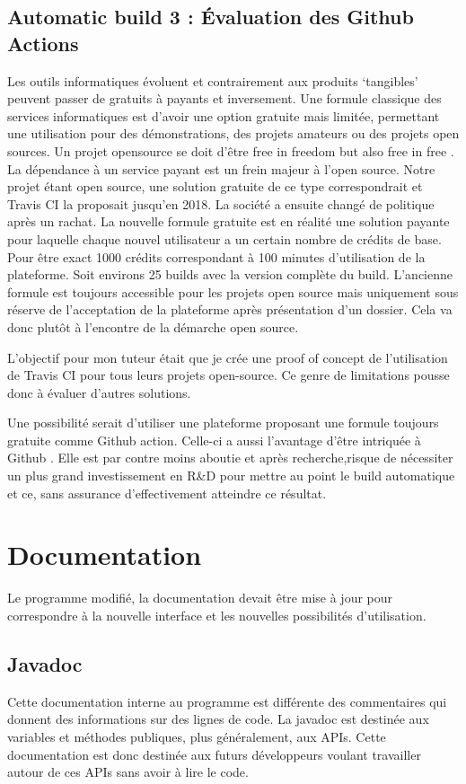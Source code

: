 \documentclass[french,a4paper,12pt]{report}
\begin{document}
\subsection{Automatic build 3 : Évaluation des Github Actions}

Les outils informatiques évoluent et contrairement aux produits ‘tangibles’ peuvent passer de gratuits à payants et inversement. Une formule classique des services informatiques est d’avoir une option gratuite mais limitée, permettant une utilisation pour des démonstrations, des projets amateurs ou des projets open sources. Un projet opensource se doit d’être free in freedom but also free in free . La dépendance à un service payant est un frein majeur à l’open source. Notre projet étant open source, une solution gratuite de ce type correspondrait et Travis CI la proposait jusqu’en 2018. La société a ensuite changé de politique après un rachat. La nouvelle formule gratuite est en réalité une solution payante pour laquelle chaque nouvel utilisateur a un certain nombre de crédits de base. Pour être exact 1000 crédits correspondant à 100 minutes d’utilisation de la plateforme. Soit environs 25 builds avec la version complète du build. L'ancienne formule est toujours accessible pour les projets open source mais uniquement sous réserve de l'acceptation de la plateforme après présentation d'un dossier. Cela va donc plutôt à l’encontre de la démarche open source.

L’objectif pour mon tuteur était que je crée une proof of concept de l’utilisation de Travis CI pour tous leurs projets open-source. Ce genre de limitations pousse donc à évaluer d'autres solutions.

Une possibilité serait d’utiliser une plateforme proposant une formule toujours gratuite comme Github action. Celle-ci a aussi l’avantage d’être intriquée à Github . Elle est par contre moins aboutie et après recherche,risque de nécessiter un plus grand investissement en R\&D pour mettre au  point le build automatique et ce, sans assurance d’effectivement atteindre ce résultat.

\section{Documentation}

Le programme modifié, la documentation devait être mise à jour pour correspondre à la nouvelle interface et les nouvelles possibilités d’utilisation.

\subsection{Javadoc}
Cette documentation interne au programme est différente des commentaires qui donnent des informations sur des lignes de code. La javadoc est destinée aux variables et méthodes publiques, plus généralement, aux APIs. Cette documentation est donc destinée aux futurs développeurs voulant travailler autour de ces APIs sans avoir à lire le code.
\end{document}
